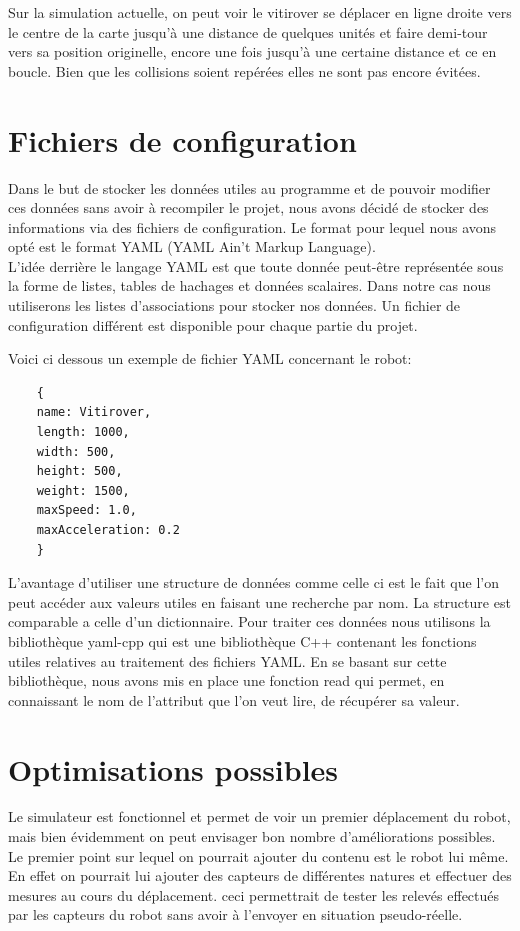 \documentclass[usenames,dvipsnames]{report}
\begin{document}
        Sur la simulation actuelle, on peut voir le vitirover se déplacer en ligne droite vers le centre de la carte jusqu’à une distance de quelques unités et faire demi-tour vers sa position originelle, encore une fois jusqu’à une certaine distance et ce en boucle. Bien que les collisions soient repérées elles ne sont pas encore évitées.
        
    \chapter{Fichiers de configuration}
    Dans le but de stocker les données utiles au programme et de pouvoir modifier ces données 
    sans avoir à recompiler le projet, nous avons décidé de stocker des informations via des 
    fichiers de configuration. Le format pour lequel nous avons opté est le format YAML (YAML Ain’t Markup Language). 
    \\
    
    L’idée derrière le langage YAML est que toute donnée peut-être représentée sous la forme de listes, tables de hachages
     et données scalaires. Dans notre cas nous utiliserons les listes d’associations pour stocker nos données.
        Un fichier de configuration différent est disponible pour chaque partie du projet. 
        
        Voici ci dessous un exemple de fichier YAML concernant le robot:
    \begin{verbatim}
    {
    name: Vitirover,
    length: 1000,
    width: 500,
    height: 500,
    weight: 1500,
    maxSpeed: 1.0,
    maxAcceleration: 0.2
    }
    \end{verbatim}


    L’avantage d’utiliser une structure de données comme celle ci est le fait que l’on peut accéder aux valeurs utiles en faisant une recherche par nom. La structure est comparable a celle d’un dictionnaire. Pour traiter ces données nous utilisons la bibliothèque yaml-cpp qui est une bibliothèque C++ contenant les fonctions utiles relatives au traitement des fichiers YAML. En se basant sur cette bibliothèque, nous avons mis en place une fonction read qui permet, en connaissant le nom de l’attribut que l’on veut lire, de récupérer sa valeur.

        
    \chapter{Optimisations possibles}
    Le simulateur est fonctionnel et permet de voir un premier déplacement du robot, 
    mais bien évidemment on peut envisager bon nombre d’améliorations possibles. 
    Le premier point sur lequel on pourrait ajouter du contenu est le robot lui même.
     En effet on pourrait lui ajouter des capteurs de différentes natures et effectuer 
     des mesures au cours du déplacement. ceci permettrait de tester les relevés effectués 
     par les capteurs du robot sans avoir à l’envoyer en situation pseudo-réelle.
     
\end{document}
